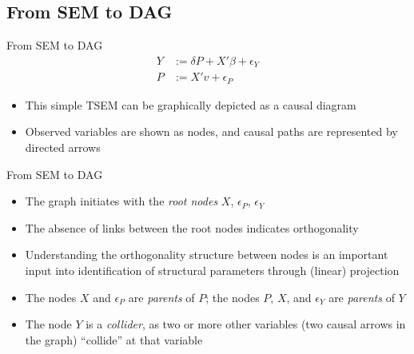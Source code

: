\documentclass[aspectratio=1610,12pt,xcolor=dvipsnames]{beamer}
\begin{document}
\subsection{From SEM to DAG}

\begin{frame}
  \subsectionpage
\end{frame}

\begin{frame}{From SEM to DAG}
    \begin{align*}
            Y &:= \delta P + X'\beta + \epsilon_Y \\
            P &:= X' v + \epsilon_P 
    \end{align*}
    
    \begin{itemize}
    \item This simple TSEM can be graphically depicted as a causal diagram
    \item Observed variables are shown as nodes, and causal paths are represented by directed arrows
    \end{itemize}
    \centering
\end{frame}

\begin{frame}{From SEM to DAG}

\begin{itemize}
    \item The graph initiates with the \textit{root nodes} $X$, $\epsilon_P$, $\epsilon_Y$
    \item The absence of links between the root nodes indicates orthogonality
    \item Understanding the orthogonality structure between nodes is an important input into identification of structural parameters through (linear) projection
    \item The nodes $X$ and $\epsilon_P$ are \textit{parents} of $P$; the nodes $P$, $X$, and $\epsilon_Y$ are \textit{parents} of $Y$
    \item The node $Y$ is a \textit{collider}, as two or more other variables (two causal arrows in the graph) ``collide'' at that variable
\end{itemize}
\end{frame}
\end{document}
